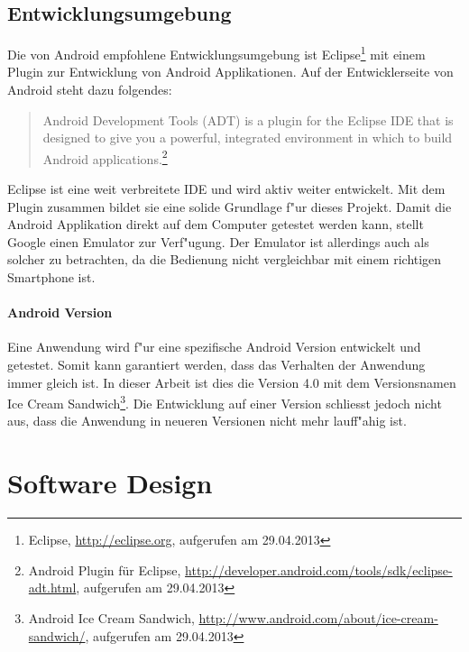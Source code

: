\subsection{Entwicklungsumgebung}
Die von Android empfohlene Entwicklungsumgebung ist Eclipse\footnote{Eclipse, \url{http://eclipse.org}, aufgerufen am 29.04.2013}  mit einem Plugin zur Entwicklung von Android Applikationen. Auf der Entwicklerseite von Android steht dazu folgendes:
\begin{quotation}
Android Development Tools (ADT) is a plugin for the Eclipse IDE that is designed to give you a powerful, integrated environment in which to build Android applications.\footnote{Android Plugin f\"{u}r Eclipse, \url{http://developer.android.com/tools/sdk/eclipse-adt.html}, aufgerufen am 29.04.2013} 
\end{quotation}
Eclipse ist eine weit verbreitete IDE und wird aktiv weiter entwickelt. Mit dem Plugin zusammen bildet sie eine solide Grundlage f"{u}r dieses Projekt.
Damit die Android Applikation direkt auf dem Computer getestet werden kann, stellt Google einen Emulator zur Verf"{u}gung. Der Emulator ist allerdings auch als solcher zu betrachten, da die Bedienung nicht vergleichbar mit einem richtigen Smartphone ist.

\paragraph{Android Version}
Eine Anwendung wird f"{u}r eine spezifische Android Version entwickelt und getestet. Somit kann garantiert werden, dass das Verhalten der Anwendung immer gleich ist. In dieser Arbeit ist dies die Version 4.0 mit dem Versionsnamen Ice Cream Sandwich\footnote{Android Ice Cream Sandwich, \url{http://www.android.com/about/ice-cream-sandwich/}, aufgerufen am 29.04.2013}.
Die Entwicklung auf einer Version schliesst jedoch nicht aus, dass die Anwendung in neueren Versionen nicht mehr lauff"{a}hig ist.



\section{Software Design}
